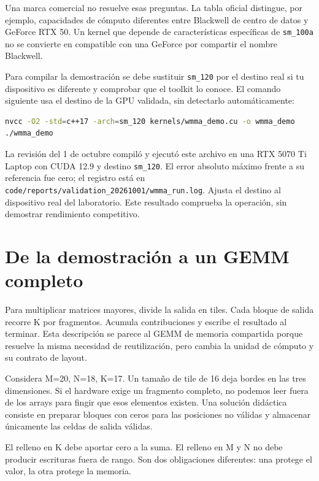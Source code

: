 \documentclass[12pt,a4paper,oneside]{report}
\begin{document}
Una marca comercial no resuelve esas preguntas. La tabla oficial distingue, por ejemplo, capacidades de cómputo diferentes entre Blackwell de centro de datos y GeForce RTX 50. Un kernel que depende de características específicas de \texttt{sm\_100a} no se convierte en compatible con una GeForce por compartir el nombre Blackwell. \cite{cuda-gpus,cutlass}

Para compilar la demostración se debe sustituir \texttt{sm\_120} por el destino real si tu dispositivo es diferente y comprobar que el toolkit lo conoce. El comando siguiente usa el destino de la GPU validada, sin detectarlo automáticamente:

\begin{lstlisting}[language=bash]
nvcc -O2 -std=c++17 -arch=sm_120 kernels/wmma_demo.cu -o wmma_demo
./wmma_demo
\end{lstlisting}
\begin{cuidado}
La revisión del 1 de octubre compiló y ejecutó este archivo en una RTX 5070 Ti Laptop con CUDA 12.9 y destino \texttt{sm\_120}. El error absoluto máximo frente a su referencia fue cero; el registro está en \texttt{code/reports\allowbreak{}/validation\_\allowbreak{}20261001/wmm\allowbreak{}a\_run.log}. Ajusta el destino al dispositivo real del laboratorio. Este resultado comprueba la operación, sin demostrar rendimiento competitivo.

\end{cuidado}
\section{De la demostración a un GEMM completo}
Para multiplicar matrices mayores, divide la salida en tiles. Cada bloque de salida recorre K por fragmentos. Acumula contribuciones y escribe el resultado al terminar. Esta descripción se parece al GEMM de memoria compartida porque resuelve la misma necesidad de reutilización, pero cambia la unidad de cómputo y su contrato de layout.

Considera M=20, N=18, K=17. Un tamaño de tile de 16 deja bordes en las tres dimensiones. Si el hardware exige un fragmento completo, no podemos leer fuera de los arrays para fingir que esos elementos existen. Una solución didáctica consiste en preparar bloques con ceros para las posiciones no válidas y almacenar únicamente las celdas de salida válidas.

El relleno en K debe aportar cero a la suma. El relleno en M y N no debe producir escrituras fuera de rango. Son dos obligaciones diferentes: una protege el valor, la otra protege la memoria.
\end{document}
